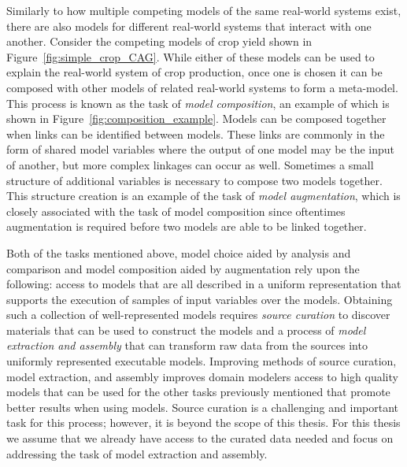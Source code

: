 Similarly to how multiple competing models of the same real-world systems exist, there are also models for different real-world systems that interact with one another.
Consider the competing models of crop yield shown in Figure~\ref{fig:simple_crop_CAG}.
While either of these models can be used to explain the real-world system of crop production, once one is chosen it can be composed with other models of related real-world systems to form a meta-model.
This process is known as the task of \textit{model composition}, an example of which is shown in Figure~\ref{fig:composition_example}.
Models can be composed together when links can be identified between models.
These links are commonly in the form of shared model variables where the output of one model may be the input of another, but more complex linkages can occur as well.
Sometimes a small structure of additional variables is necessary to compose two models together.
This structure creation is an example of the task of \textit{model augmentation}, which is closely associated with the task of model composition since oftentimes augmentation is required before two models are able to be linked together.

Both of the tasks mentioned above, model choice aided by analysis and comparison and model composition aided by augmentation rely upon the following: access to models that are all described in a uniform representation that supports the execution of samples of input variables over the models.
Obtaining such a collection of well-represented models requires \textit{source curation} to discover materials that can be used to construct the models and a process of \textit{model extraction and assembly} that can transform raw data from the sources into uniformly represented executable models.
Improving methods of source curation, model extraction, and assembly improves domain modelers access to high quality models that can be used for the other tasks previously mentioned that promote better results when using models.
Source curation is a challenging and important task for this process; however, it is beyond the scope of this thesis.
For this thesis we assume that we already have access to the curated data needed and focus on addressing the task of model extraction and assembly.

